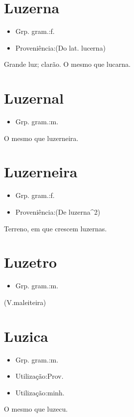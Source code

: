 \section{Luzerna}
\begin{itemize}
\item {Grp. gram.:f.}
\end{itemize}
\begin{itemize}
\item {Proveniência:(Do lat. \textunderscore lucerna\textunderscore )}
\end{itemize}
Grande luz; clarão.
O mesmo que \textunderscore lucarna\textunderscore .
\section{Luzernal}
\begin{itemize}
\item {Grp. gram.:m.}
\end{itemize}
O mesmo que \textunderscore luzerneira\textunderscore .
\section{Luzerneira}
\begin{itemize}
\item {Grp. gram.:f.}
\end{itemize}
\begin{itemize}
\item {Proveniência:(De \textunderscore luzerna\textunderscore ^2)}
\end{itemize}
Terreno, em que crescem luzernas.
\section{Luzetro}
\begin{itemize}
\item {Grp. gram.:m.}
\end{itemize}
(V.maleiteira)
\section{Luzica}
\begin{itemize}
\item {Grp. gram.:m.}
\end{itemize}
\begin{itemize}
\item {Utilização:Prov.}
\end{itemize}
\begin{itemize}
\item {Utilização:minh.}
\end{itemize}
O mesmo que \textunderscore luzecu\textunderscore .
